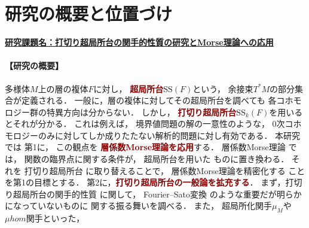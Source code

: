 \documentclass[10pt,a4paper,uplatex,dvipdfmx]{ujarticle} 		%
\newcommand{\研究課題名}{打切り超局所台の関手的性質の研究とMorse理論への応用}
\newcommand{\研究機関名}{北海道大学}
\newcommand{\研究代表者氏名}{大柴寿浩}
\begin{document}

\section{研究の概要と位置づけ}

\noindent
\underline{\textbf{研究課題名：\研究課題名}}
\vspace{-10pt}
\paragraph{【研究の概要】}
多様体\(M\)上の層の複体\(F\)に対し，
\textcolor{darkred}{\textbf{超局所台}}\(\mathrm{SS}(F)\)という，
余接束\(T^{\ast}M\)の部分集合が定義される．
一般に，層の複体に対してその超局所台を調べても
各コホモロジー群の特異方向は分からない．
しかし，
\textcolor{darkred}{\textbf{打切り超局所台}}\(
	\mathrm{SS}_{k}(F)
\)を用いるとそれが分かる．
これは例えば，
境界値問題の解の一意性のような，
\(0\)次コホモロジーのみに対してしか成りたたない解析的問題に対し有効である．
本研究では
第1に，
この観点を
\textcolor{darkred}{\textbf{層係数Morse理論を応用}}する．
層係数Morse理論
では，
関数の臨界点に関する条件が，
超局所台を用いた
ものに置き換わる．
それを
打切り超局所台
に取り替えることで，
層係数Morse理論を精密化する
ことを第1の目標とする．
第2に，\textcolor{darkred}{\textbf{打切り超局所台の一般論を拡充する}}．
まず，打切り超局所台の関手的性質
に関して，
Fourier--Sato変換
のような重要だが明らかになっていないものに
関する振る舞いを調べる．
また，
超局所化関手\(\mu_M\)や\(\mu hom\)関手といった，
\end{document}
